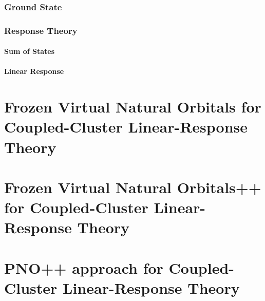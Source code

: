 \documentclass[12pt]{report}
\begin{document}
\subsection{Ground State}
\subsection{Response Theory}
\subsubsection{Sum of States}
\subsubsection{Linear Response}
\chapter{Frozen Virtual Natural Orbitals for Coupled-Cluster Linear-Response Theory}

\chapter{Frozen Virtual Natural Orbitals++ for Coupled-Cluster Linear-Response Theory}

\chapter{PNO++ approach for Coupled-Cluster Linear-Response Theory}

%
%

%





%


\end{document}
